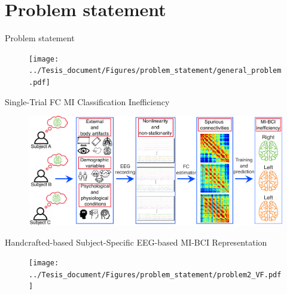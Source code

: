 \documentclass[aspectratio=169]{beamer}
\begin{document}
\section{Problem statement}

\begin{frame}{Problem statement}
    \begin{figure}[!ht]
        \centering
        \texttt{[image: ../Tesis\_document/Figures/problem\_statement/general\_problem.pdf]}
    \end{figure}
\end{frame}

\begin{frame}{Single-Trial FC MI Classification Inefficiency}
    \begin{figure}[!ht]
        \centering
        \includegraphics[width=1\linewidth]{../Tesis_document/Figures/problem_statement/problem1_FV.pdf}
    \end{figure}
\end{frame}

\begin{frame}{Handcrafted-based Subject-Specific EEG-based MI-BCI Representation}
    \begin{figure}[!ht]
        \centering
        \texttt{[image: ../Tesis\_document/Figures/problem\_statement/problem2\_VF.pdf]}
    \end{figure}
\end{frame}
\end{document}

